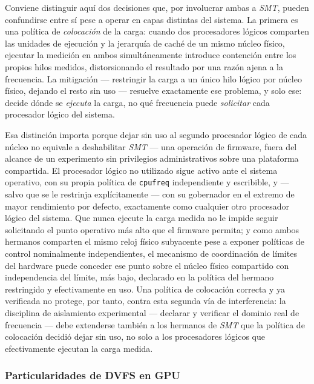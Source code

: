 \documentclass[12pt,oneside,spanish]{book}
\begin{document}
Conviene distinguir aquí dos decisiones que, por involucrar ambas a \textit{SMT}, pueden confundirse entre sí pese a operar en capas distintas del sistema. La primera es una política de \emph{colocación} de la carga: cuando dos procesadores lógicos comparten las unidades de ejecución y la jerarquía de caché de un mismo núcleo físico, ejecutar la medición en ambos simultáneamente introduce contención entre los propios hilos medidos, distorsionando el resultado por una razón ajena a la frecuencia. La mitigación --- restringir la carga a un único hilo lógico por núcleo físico, dejando el resto sin uso --- resuelve exactamente ese problema, y solo ese: decide dónde se \emph{ejecuta} la carga, no qué frecuencia puede \emph{solicitar} cada procesador lógico del sistema.

Esa distinción importa porque dejar sin uso al segundo procesador lógico de cada núcleo no equivale a deshabilitar \textit{SMT} --- una operación de firmware, fuera del alcance de un experimento sin privilegios administrativos sobre una plataforma compartida. El procesador lógico no utilizado sigue activo ante el sistema operativo, con su propia política de \texttt{cpufreq} independiente y escribible, y --- salvo que se le restrinja explícitamente --- con su gobernador en el extremo de mayor rendimiento por defecto, exactamente como cualquier otro procesador lógico del sistema. Que nunca ejecute la carga medida no le impide seguir solicitando el punto operativo más alto que el firmware permita; y como ambos hermanos comparten el mismo reloj físico subyacente pese a exponer políticas de control nominalmente independientes, el mecanismo de coordinación de límites del hardware puede conceder ese punto sobre el núcleo físico compartido con independencia del límite, más bajo, declarado en la política del hermano restringido y efectivamente en uso. Una política de colocación correcta y ya verificada no protege, por tanto, contra esta segunda vía de interferencia: la disciplina de aislamiento experimental --- declarar y verificar el dominio real de frecuencia --- debe extenderse también a los hermanos de \textit{SMT} que la política de colocación decidió dejar sin uso, no solo a los procesadores lógicos que efectivamente ejecutan la carga medida.

\subsubsection{Particularidades de DVFS en GPU}
\end{document}
